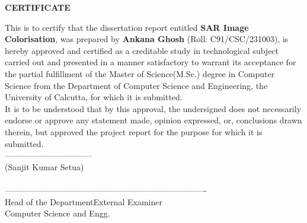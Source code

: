 \begin{center}
    {\large {\bf CERTIFICATE}}
\end{center}

This is to certify that the dissertation report entitled \textbf{SAR Image Colorisation}, was prepared by \textbf{Ankana Ghosh} (Roll: C91/CSC/231003), is hereby approved and certified as a creditable study in technological subject carried out and presented in a manner satisfactory to warrant its acceptance for the partial fulfillment of the Master of Science(M.Sc.) degree in Computer Science from the Department of Computer Science and Engineering, the University of Calcutta, for which it is submitted. \\
It is to be understood that by this approval, the undersigned does not necessarily endorse or approve any statement made, opinion expressed, or, conclusions drawn therein, but approved the project report for the purpose for which it is submitted.
\\[.5cm]

\large{--------------------------------}\\
\hspace*{.4in}\large{(Sanjit Kumar Setua)}\\
\hspace*{.5in}\\[1.0cm]

\large{---------------------------------------}\hspace*{1.5in}\large{----------------------------------}\\
\hspace*{.4in}\large{Head of the Department}\hspace*{2.2in}\large{External Examiner}
\\[0.1cm]
\hspace*{.2in}Computer Science and Engg.